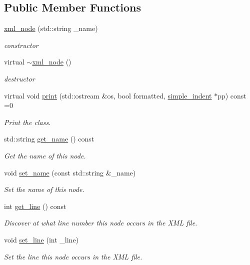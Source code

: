 \subsection*{Public Member Functions}
\begin{DoxyCompactItemize}
\item 
\hyperlink{classxml__node_a4de8545189dbe740668066872579d9d3}{xml\+\_\+node} (std\+::string \+\_\+name)
\begin{DoxyCompactList}\small\item\em constructor \end{DoxyCompactList}\item 
virtual \hyperlink{classxml__node_a9cf087ddb4d9b7d86a120504d62a56d4}{$\sim$xml\+\_\+node} ()
\begin{DoxyCompactList}\small\item\em destructor \end{DoxyCompactList}\item 
virtual void \hyperlink{classxml__node_a150e224e18301e5842d10a5e47cc2661}{print} (std\+::ostream \&os, bool formatted, \hyperlink{classsimple__indent}{simple\+\_\+indent} $\ast$pp) const =0
\begin{DoxyCompactList}\small\item\em Print the class. \end{DoxyCompactList}\item 
std\+::string \hyperlink{classxml__node_a3ed9ef0b9fa4767ef02a1be8e01217b3}{get\+\_\+name} () const
\begin{DoxyCompactList}\small\item\em Get the name of this node. \end{DoxyCompactList}\item 
void \hyperlink{classxml__node_afdc073fc5ee6b09e636a6d9da116a091}{set\+\_\+name} (const std\+::string \&\+\_\+name)
\begin{DoxyCompactList}\small\item\em Set the name of this node. \end{DoxyCompactList}\item 
int \hyperlink{classxml__node_afc1ae2a83ce4949d511fdaef96d0e4f7}{get\+\_\+line} () const
\begin{DoxyCompactList}\small\item\em Discover at what line number this node occurs in the X\+ML file. \end{DoxyCompactList}\item 
void \hyperlink{classxml__node_a30f49d888b25333212fa22cf1f8205aa}{set\+\_\+line} (int \+\_\+line)
\begin{DoxyCompactList}\small\item\em Set the line this node occurs in the X\+ML file. \end{DoxyCompactList}\end{DoxyCompactItemize}
